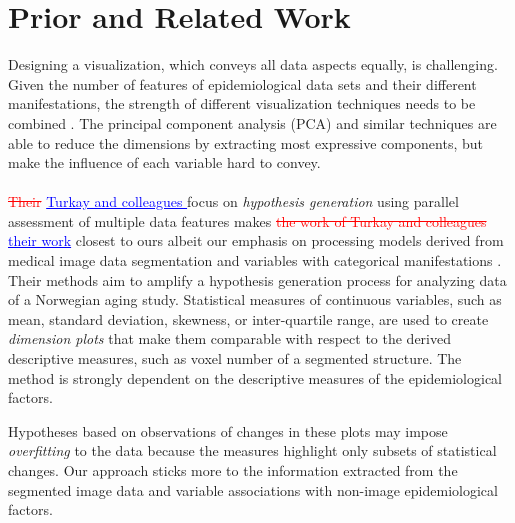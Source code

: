 \documentclass[journal]{style/vgtc} 			          %
\newcommand{\rem}[1]{\textcolor{red}{\sout{#1}}}
\newcommand{\add}[1]{\textcolor{blue}{\uline{#1}}}
\begin{document}
\section{Prior and Related Work}
Designing a visualization, which conveys all data aspects equally, is challenging.
%
Given the number of features of epidemiological data sets and their different manifestations, the strength of different visualization techniques needs to be combined \cite{Buja91, Konyha2009}.
%
The principal component analysis (PCA) and similar techniques are able to reduce the dimensions by extracting most expressive components, but make the influence of each variable hard to convey.
\\\\
\rem{Their} \add{Turkay and colleagues \cite{Turkay2013}} focus on \emph{hypothesis generation} using parallel assessment of multiple data features makes \rem{the work of Turkay and colleagues} \add{their work} closest to ours albeit our emphasis on processing models derived from medical image data segmentation and variables with categorical manifestations \rem{\cite{Turkay2013}}.
%
Their methods aim to amplify a hypothesis generation process for analyzing data of a Norwegian aging study.
%
Statistical measures of continuous variables, such as mean, standard deviation, skewness, or inter-quartile range, are used to create \emph{dimension plots} that make them comparable with respect to the derived descriptive measures, such as voxel number of a segmented structure.
%
%
%
%
%
The method is strongly dependent on the descriptive measures of the epidemiological factors.

Hypotheses based on observations of changes in these plots may impose \emph{overfitting} to the data because the measures highlight only subsets of statistical changes.
%
Our approach sticks more to the information extracted from the segmented image data and variable associations with non-image epidemiological factors.
\end{document}
